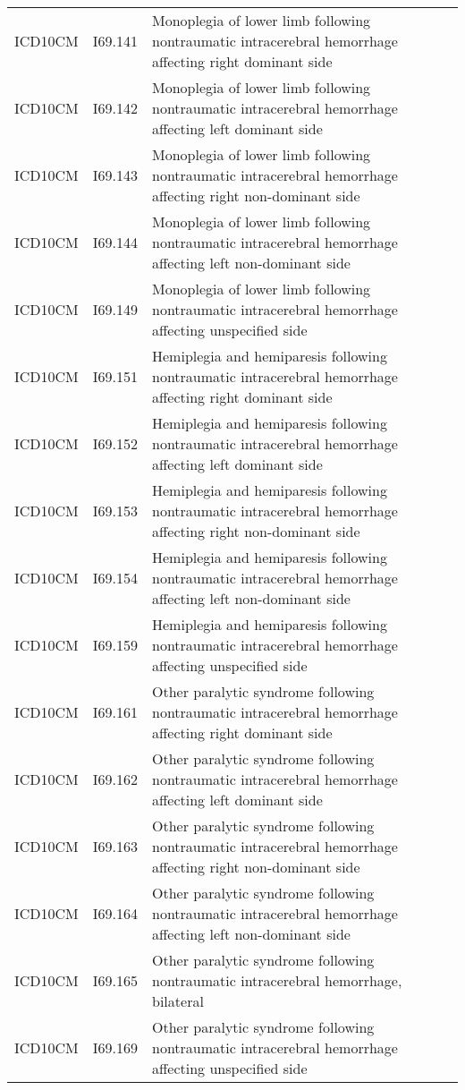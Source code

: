 \begin{longtable}{p{}p{}p{}}
  ICD10CM & I69.141 & Monoplegia of lower limb following nontraumatic intracerebral hemorrhage affecting right dominant side \\ 
  ICD10CM & I69.142 & Monoplegia of lower limb following nontraumatic intracerebral hemorrhage affecting left dominant side \\ 
  ICD10CM & I69.143 & Monoplegia of lower limb following nontraumatic intracerebral hemorrhage affecting right non-dominant side \\ 
  ICD10CM & I69.144 & Monoplegia of lower limb following nontraumatic intracerebral hemorrhage affecting left non-dominant side \\ 
  ICD10CM & I69.149 & Monoplegia of lower limb following nontraumatic intracerebral hemorrhage affecting unspecified side \\ 
  ICD10CM & I69.151 & Hemiplegia and hemiparesis following nontraumatic intracerebral hemorrhage affecting right dominant side \\ 
  ICD10CM & I69.152 & Hemiplegia and hemiparesis following nontraumatic intracerebral hemorrhage affecting left dominant side \\ 
  ICD10CM & I69.153 & Hemiplegia and hemiparesis following nontraumatic intracerebral hemorrhage affecting right non-dominant side \\ 
  ICD10CM & I69.154 & Hemiplegia and hemiparesis following nontraumatic intracerebral hemorrhage affecting left non-dominant side \\ 
  ICD10CM & I69.159 & Hemiplegia and hemiparesis following nontraumatic intracerebral hemorrhage affecting unspecified side \\ 
  ICD10CM & I69.161 & Other paralytic syndrome following nontraumatic intracerebral hemorrhage affecting right dominant side \\ 
  ICD10CM & I69.162 & Other paralytic syndrome following nontraumatic intracerebral hemorrhage affecting left dominant side \\ 
  ICD10CM & I69.163 & Other paralytic syndrome following nontraumatic intracerebral hemorrhage affecting right non-dominant side \\ 
  ICD10CM & I69.164 & Other paralytic syndrome following nontraumatic intracerebral hemorrhage affecting left non-dominant side \\ 
  ICD10CM & I69.165 & Other paralytic syndrome following nontraumatic intracerebral hemorrhage, bilateral \\ 
  ICD10CM & I69.169 & Other paralytic syndrome following nontraumatic intracerebral hemorrhage affecting unspecified side \\ 

\end{longtable}
